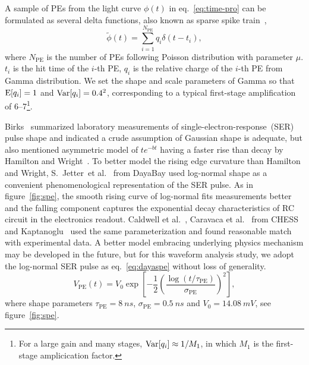 A sample of PEs from the light curve $\phi(t)$ in eq.~\eqref{eq:time-pro} can be formulated as several delta functions, also known as sparse spike train~\cite{levy_reconstruction_1981}, 
\begin{equation}
  \label{eq:lc-sample}
  \tilde{\phi}(t) = \sum_{i=1}^{N_{\mathrm{PE}}} q_i \delta(t-t_i),
\end{equation}
where $N_\mathrm{PE}$ is the number of PEs following Poisson distribution with parameter $\mu$.  $t_i$ is the hit time of the $i$-th PE, $q_i$ is the relative charge of the $i$-th PE from Gamma distribution.  We set the shape and scale parameters of Gamma so that $\operatorname{E}[q_i] = 1$ and $\operatorname{Var}[q_i] = 0.4^2$, corresponding to a typical first-stage amplification of 6--7\footnote{For a large gain and many stages, $\operatorname{Var}[q_i] \approx 1 / M_1$, in which $M_1$ is the first-stage amplicication factor.}.

Birks~\cite{birks_theory_1967} summarized laboratory measurements of single-electron-response~(SER) pulse shape and indicated a crude assumption of Gaussian shape is adequate, but also mentioned asymmetric model of $t e^{-bt}$ having a faster rise than decay by Hamilton and Wright~\cite{hamilton_transit_1956}.  To better model the rising edge curvature than Hamilton and Wright, S.~Jetter~et al.~\cite{jetter_pmt_2012} from DayaBay used log-normal shape as a convenient phenomenological representation of the SER pulse.  As in figure~\ref{fig:spe}, the smooth rising curve of log-normal fits measurements better and the falling component captures the exponential decay characteristics of RC circuit in the electronics readout.  Caldwell et al.~\cite{caldwell_characterization_2013}, Caravaca et al.~\cite{caravaca_experiment_2017} from CHESS and Kaptanoglu~\cite{kaptanoglu_characterization_2018} used the same parameterization and found reasonable match with experimental data.  A better model embracing underlying physics mechanism may be developed in the future, but for this waveform analysis study, we adopt the log-normal SER pulse as eq.~\eqref{eq:dayaspe} without loss of generality.
\begin{equation}
  V_\mathrm{PE}(t) = V_{0}\exp\left[-\frac{1}{2}\left(\frac{\log(t/\tau_\mathrm{PE})}{\sigma_\mathrm{PE}}\right)^{2}\right],
  \label{eq:dayaspe}
\end{equation}
where shape parameters $\tau_\mathrm{PE}=\SI{8}{ns}$, $\sigma_\mathrm{PE}=\SI{0.5}{ns}$ and $V_{0}=\SI{14.08}{mV}$, see figure~\ref{fig:spe}.

